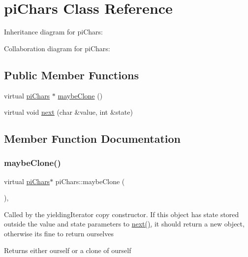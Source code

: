 \hypertarget{classpiChars}{}\section{pi\+Chars Class Reference}
\label{classpiChars}


Inheritance diagram for pi\+Chars\+:


Collaboration diagram for pi\+Chars\+:
\subsection*{Public Member Functions}
\begin{DoxyCompactItemize}
\item 
virtual \hyperlink{classpiChars}{pi\+Chars} $\ast$ \hyperlink{classpiChars_a708b2ef6ccf87b9078ee8923f4076ee1}{maybe\+Clone} ()
\item 
virtual void \hyperlink{classpiChars_adc00b73e9ec09756b81d6da657ad5170}{next} (char \&value, int \&state)
\end{DoxyCompactItemize}


\subsection{Member Function Documentation}
\mbox{\label{classpiChars_a708b2ef6ccf87b9078ee8923f4076ee1}} 
\subsubsection{\texorpdfstring{maybe\+Clone()}{maybeClone()}}
{\footnotesize\ttfamily virtual \hyperlink{classpiChars}{pi\+Chars}$\ast$ pi\+Chars\+::maybe\+Clone (\begin{DoxyParamCaption}{ }\end{DoxyParamCaption})\hspace{0.3cm}{\ttfamily [inline]}, {\ttfamily [virtual]}}

Called by the yielding\+Iterator copy constructor. If this object has state stored outside the value and state parameters to \hyperlink{classpiChars_adc00b73e9ec09756b81d6da657ad5170}{next()}, it should return a new object, otherwise it\textquotesingle{}s fine to return ourselves \begin{DoxyReturn}{Returns}
either ourself or a clone of ourself 
\end{DoxyReturn}


